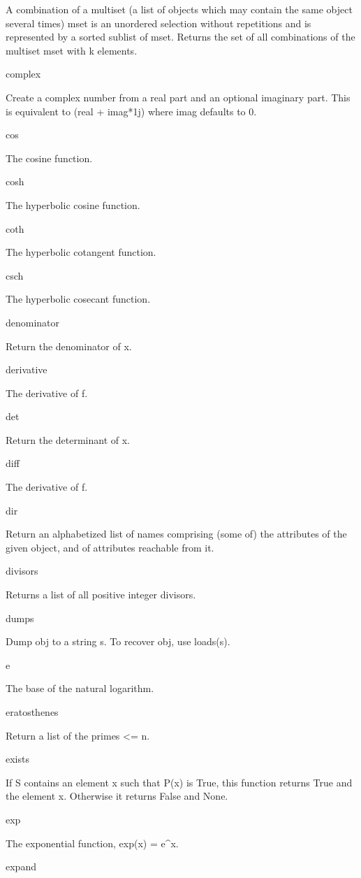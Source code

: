 \documentclass[12pt,oneside]{book}
\begin{document}
A combination of a multiset (a list of objects which may contain the same object several times) mset is an unordered selection without repetitions and is represented by a sorted sublist of mset. Returns the set of all combinations of the multiset mset with k elements.

complex

Create a complex number from a real part and an optional imaginary part. This is equivalent to (real + imag*1j) where imag defaults to 0.

cos

The cosine function.

cosh

The hyperbolic cosine function.

coth

The hyperbolic cotangent function.

csch

The hyperbolic cosecant function.

denominator

Return the denominator of x.

derivative

The derivative of f.

det

Return the determinant of x.

diff

The derivative of f.

dir

Return an alphabetized list of names comprising (some of) the attributes of the given object, and of attributes reachable from it.

divisors

Returns a list of all positive integer divisors.

dumps

Dump obj to a string s. To recover obj, use loads(s).

e

The base of the natural logarithm.

eratosthenes

Return a list of the primes {\textless}= n.

exists

If S contains an element x such that P(x) is True, this function returns True and the element x. Otherwise it returns False and None.

exp

The exponential function, exp(x) = e\^{}x.

expand
\end{document}
